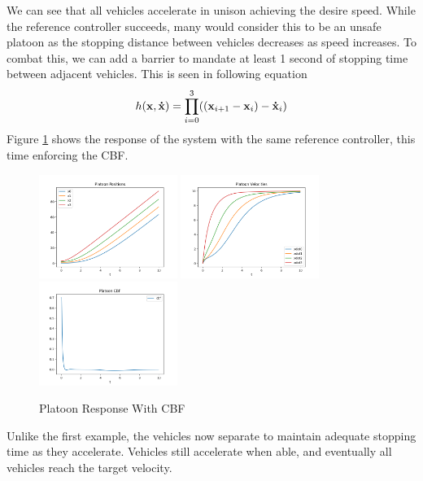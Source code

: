 \noindent We can see that all vehicles accelerate in unison achieving the desire speed. While the reference controller succeeds, many would consider this to be an unsafe platoon as the stopping distance between vehicles decreases as speed increases. To combat this, we can add a barrier to mandate at least 1 second of stopping time between adjacent vehicles. This is seen in following equation
\begin{align*}
    h({\mathbf{{x}}}, {\mathbf{\dot{x}}}) = \prod_{i = 0}^3 (({\mathbf{{x}}}_{i + 1} - {\mathbf{{x}}}_i) -  {\mathbf{\dot{x}}}_i)
\end{align*}
\noindent Figure \ref{fig:platoon_cbf} shows the response of the system with the same reference controller, this time enforcing the CBF.
\begin{figure}[H]
    \centering
    \includegraphics[width=0.4\textwidth]{Figures/Examples/Platoon/Positions.png}
    \includegraphics[width=0.4\textwidth]{Figures/Examples/Platoon/Velocities.png}
    \includegraphics[width=0.4\textwidth]{Figures/Examples/Platoon/CBF.png}
    \caption{Platoon Response With CBF}
    \label{fig:platoon_cbf}
\end{figure}
\noindent Unlike the first example, the vehicles now separate to maintain adequate stopping time as they accelerate. Vehicles still accelerate when able, and eventually all vehicles reach the target velocity.
